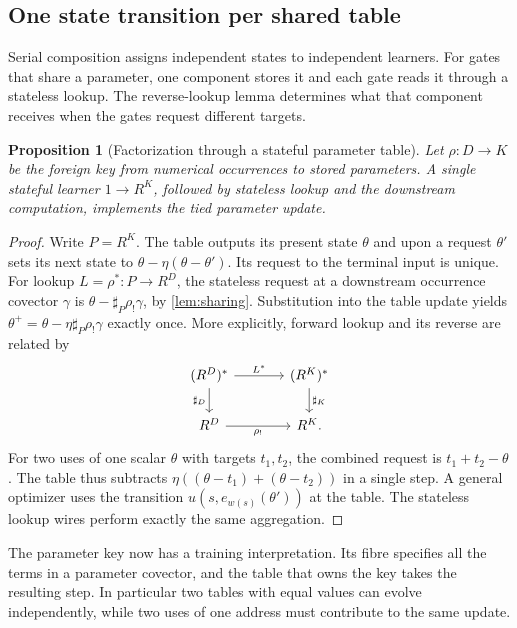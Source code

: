 \documentclass[11pt,a4paper]{article}
\newtheorem{proposition}[proposition]{Proposition}
\theoremstyle{definition}
\theoremstyle{remark}\newaliascnt{remark}{theorem}
\numberwithin{equation}{section}
\begin{document}
\subsection{One state transition per shared table}
Serial composition assigns independent states to independent learners. For gates that share a parameter, one component stores it and each gate reads it through a stateless lookup. The reverse-lookup lemma determines what that component receives when the gates request different targets.
\begin{proposition}[Factorization through a stateful parameter table]\label{thm:state-table}
Let $\rho:D\to K$ be the foreign key from numerical occurrences to stored parameters. A single stateful learner $1\to R^K$, followed by stateless lookup and the downstream computation, implements the tied parameter update.
\end{proposition}
\begin{proof}
Write $P=R^K$. The table outputs its present state $\theta$ and upon a request $\theta'$ sets its next state to $\theta-\eta(\theta-\theta')$. Its request to the terminal input is unique. For lookup $L=\rho^*:P\to R^D$, the stateless request at a downstream occurrence covector $\gamma$ is $\theta-\sharp_P\rho_!\gamma$, by \cref{lem:sharing}. Substitution into the table update yields $\theta^+=\theta-\eta\sharp_P\rho_!\gamma$ exactly once. More explicitly, forward lookup and its reverse are related by
\[
\begin{tikzcd}[column sep=large]
 (R^D)^*\arrow[r,"L^*"]\arrow[d,"\sharp_D"']&(R^K)^*\arrow[d,"\sharp_K"]\\
 R^D\arrow[r,"\rho_!"']& R^K .
\end{tikzcd}
\]
For two uses of one scalar $\theta$ with targets $t_1,t_2$, the combined request is $t_1+t_2-\theta$. The table thus subtracts $\eta((\theta-t_1)+(\theta-t_2))$ in a single step. A general optimizer uses the transition $u(s,e_{w(s)}(\theta'))$ at the table. The stateless lookup wires perform exactly the same aggregation.
\end{proof}

The parameter key now has a training interpretation. Its fibre specifies all the terms in a parameter covector, and the table that owns the key takes the resulting step. In particular two tables with equal values can evolve independently, while two uses of one address must contribute to the same update.
\end{document}
